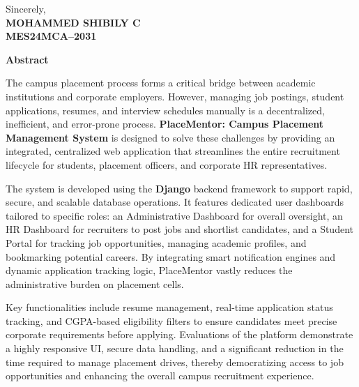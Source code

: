 \documentclass[a4paper,12pt]{report}
\begin{document}
\vspace{3cm} 

\begin{flushright}
Sincerely,\\
\textbf{MOHAMMED SHIBILY C}\\
\textbf{MES24MCA--2031}
\end{flushright}


\newpage
\begin{center}
\Large\textbf{Abstract}
\end{center}

The campus placement process forms a critical bridge between academic institutions and corporate employers. However, managing job postings, student applications, resumes, and interview schedules manually is a decentralized, inefficient, and error-prone process. \textbf{PlaceMentor: Campus Placement Management System} is designed to solve these challenges by providing an integrated, centralized web application that streamlines the entire recruitment lifecycle for students, placement officers, and corporate HR representatives.

The system is developed using the \textbf{Django} backend framework to support rapid, secure, and scalable database operations. It features dedicated user dashboards tailored to specific roles: an Administrative Dashboard for overall oversight, an HR Dashboard for recruiters to post jobs and shortlist candidates, and a Student Portal for tracking job opportunities, managing academic profiles, and bookmarking potential careers. By integrating smart notification engines and dynamic application tracking logic, PlaceMentor vastly reduces the administrative burden on placement cells.

Key functionalities include resume management, real-time application status tracking, and CGPA-based eligibility filters to ensure candidates meet precise corporate requirements before applying. Evaluations of the platform demonstrate a highly responsive UI, secure data handling, and a significant reduction in the time required to manage placement drives, thereby democratizing access to job opportunities and enhancing the overall campus recruitment experience.

\newpage

\tableofcontents
\newpage
\listoffigures
\newpage
\listoftables
\end{document}
